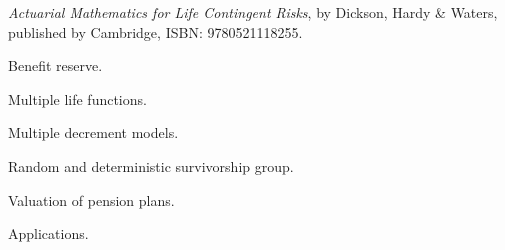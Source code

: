 \documentclass{osucourse}
\begin{document}
\CatalogDescription
\PrerequisitesAndExclusions

\begin{Text}
\emph{Actuarial Mathematics for Life Contingent Risks}, by Dickson, Hardy \& Waters, published by Cambridge, ISBN: 9780521118255.
\end{Text}

\begin{TopicsList}
\item Benefit reserve.
\item Multiple life functions.
\item Multiple decrement models.
\item Random and deterministic survivorship group.
\item Valuation of pension plans.
\item Applications.
\end{TopicsList}
\end{document}
